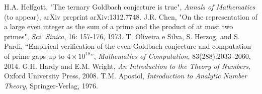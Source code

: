 \documentclass[11pt]{article}
\begin{document}
	
	
	
	\begin{thebibliography}{9}
		 H.A. Helfgott, "The ternary Goldbach conjecture is true", \emph{Annals of Mathematics} (to appear), arXiv preprint arXiv:1312.7748.
		 J.R. Chen, "On the representation of a large even integer as the sum of a prime and the product of at most two primes", \emph{Sci. Sinica}, 16: 157-176, 1973.
		 T. Oliveira e Silva, S. Herzog, and S. Pardi, ``Empirical verification of the even Goldbach conjecture and computation of prime gaps up to \( 4 \times 10^{18} \)'', \emph{Mathematics of Computation}, 83(288):2033--2060, 2014.
		 G.H. Hardy and E.M. Wright, \emph{An Introduction to the Theory of Numbers}, Oxford University Press, 2008.
		 T.M. Apostol, \emph{Introduction to Analytic Number Theory}, Springer-Verlag, 1976.
	\end{thebibliography}

	
\end{document}
